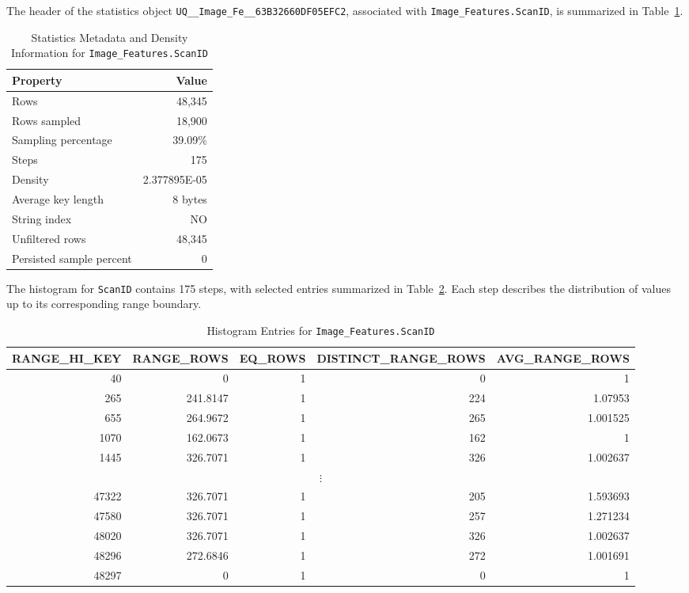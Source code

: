 The header of the statistics object \texttt{UQ\_\_Image\_Fe\_\_63B32660DF05EFC2}, associated with \texttt{Image\_Features.ScanID}, is summarized in Table~\ref{tab:q3-statistics}.

\begin{table}[htbp]
\centering
\caption{Statistics Metadata and Density Information for \texttt{Image\_Features.ScanID}}
\label{tab:q3-statistics}
\begin{tabular}{lr}
\toprule
Property & Value \\
\midrule
Rows & 48,345 \\
Rows sampled & 18,900 \\
Sampling percentage & 39.09\% \\
Steps & 175 \\
Density & 2.377895E-05 \\
Average key length & 8 bytes \\
String index & NO \\
Unfiltered rows & 48,345 \\
Persisted sample percent & 0 \\
\bottomrule
\end{tabular}
\end{table}

The histogram for \texttt{ScanID} contains 175 steps, with selected entries summarized in Table~\ref{tab:q3_scanid_histogram}. Each step describes the distribution of values up to its corresponding range boundary.

\begin{table}[htbp]
\centering
\small
\caption{Histogram Entries for \texttt{Image\_Features.ScanID}}
\label{tab:q3_scanid_histogram}
\begin{tabular}{|r|r|r|r|r|}
\hline
RANGE\_HI\_KEY & RANGE\_ROWS & EQ\_ROWS &
DISTINCT\_RANGE\_ROWS & AVG\_RANGE\_ROWS \\
\hline
40    & 0        & 1 & 0   & 1 \\
\hline
265   & 241.8147 & 1 & 224 & 1.07953 \\
\hline
655   & 264.9672 & 1 & 265 & 1.001525 \\
\hline
1070  & 162.0673 & 1 & 162 & 1 \\
\hline
1445  & 326.7071 & 1 & 326 & 1.002637 \\
\hline
\multicolumn{5}{|c|}{$\vdots$} \\
\hline
47322 & 326.7071 & 1 & 205 & 1.593693 \\
\hline
47580 & 326.7071 & 1 & 257 & 1.271234 \\
\hline
48020 & 326.7071 & 1 & 326 & 1.002637 \\
\hline
48296 & 272.6846 & 1 & 272 & 1.001691 \\
\hline
48297 & 0        & 1 & 0   & 1 \\
\hline
\end{tabular}
\end{table}

